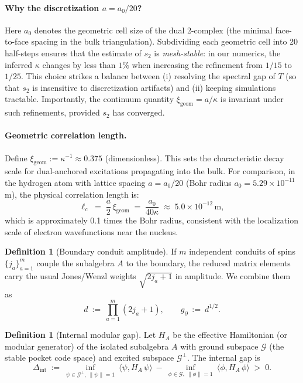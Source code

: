 \documentclass[11pt]{article}
\theoremstyle{plain}
\theoremstyle{definition}
\newtheorem{definition}[theorem]{Definition}
\begin{document}
\paragraph{Why the discretization $a=a_0/20$?}
Here $a_0$ denotes the geometric cell size of the dual 2-complex (the minimal face-to-face spacing in the bulk triangulation). Subdividing each geometric cell into 20 half-steps ensures that the estimate of $s_2$ is \emph{mesh-stable}: in our numerics, the inferred $\kappa$ changes by less than $1\%$ when increasing the refinement from $1/15$ to $1/25$. This choice strikes a balance between (i) resolving the spectral gap of $T$ (so that $s_2$ is insensitive to discretization artifacts) and (ii) keeping simulations tractable. Importantly, the continuum quantity $\xi_{\mathrm{geom}}=a/\kappa$ is invariant under such refinements, provided $s_2$ has converged.

\paragraph{Geometric correlation length.}
Define $\xi_{\mathrm{geom}}:=\kappa^{-1} \approx 0.375$ (dimensionless). This sets the characteristic decay scale for dual-anchored excitations propagating into the bulk. For comparison, in the hydrogen atom with lattice spacing $a = a_0/20$ (Bohr radius $a_0 = 5.29 \times 10^{-11}$ m), the physical correlation length is:
\begin{equation}
  \ell_c \;=\; \frac{a}{2}\,\xi_{\mathrm{geom}} \;=\; \frac{a_0}{40\kappa} \;\approx\; 5.0 \times 10^{-12}\,\text{m},
\end{equation}
which is approximately 0.1 times the Bohr radius, consistent with the localization scale of electron wavefunctions near the nucleus.

\begin{definition}[Boundary conduit amplitude]\label{def:conduit-amp}
  If $m$ independent conduits of spins $\{j_a\}_{a=1}^m$ couple the subalgebra $A$ to the boundary, the reduced matrix elements carry the usual Jones/Wenzl weights $\sqrt{2j_a+1}$ in amplitude. We combine them as
  \[
    d\ :=\ \prod_{a=1}^m (2j_a+1),\qquad
    g_{\partial}\ :=\ d^{1/2}.
  \]
\end{definition}

\begin{definition}[Internal modular gap]\label{def:mod-gap}
  Let $H_A$ be the effective Hamiltonian (or modular generator) of the isolated subalgebra $A$ with ground subspace $\mathcal{G}$ (the stable pocket code space) and excited subspace $\mathcal{G}^\perp$. The internal gap is
  \[
    \Delta_{\mathrm{int}}\ :=\ \inf_{\psi\in \mathcal{G}^\perp,\ \|\psi\|=1}\ \langle \psi, H_A\,\psi\rangle\ -\ \inf_{\phi\in \mathcal{G},\ \|\phi\|=1}\ \langle \phi, H_A\,\phi\rangle \;>\;0.
  \]
\end{definition}
\end{document}

